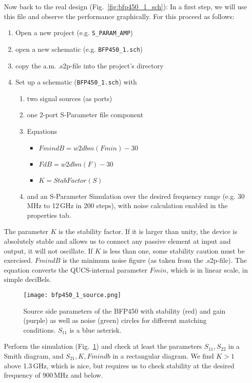 Now back to the real design (Fig.~\ref{fig:bfp450_1_sch}): In a first step,
we will use this file and observe the performance graphically. For
this proceed as follows:
\begin{enumerate}
\item Open a new project (e.g. \texttt{S\_PARAM\_AMP})
\item open a new schematic (e.g. \texttt{BFP450\_1.sch})
\item copy the a.m. .s2p-file into the project's directory
\item Set up a schematic (\texttt{BFP450\_1.sch}) with
  \begin{enumerate}
  \item two signal sources (as ports)
  \item one 2-port S-Parameter file component
  \item Equations
    \begin{itemize}
    \item $FmindB=w2dbm(Fmin)-30$
    \item $FdB=w2dbm(F)-30$
    \item $K=StabFactor(S)$
    \end{itemize}
  \item and an S-Parameter Simulation over the desired frequency range
    (e.g. 30\,MHz to 12\,GHz in 200 steps), with noise calculation
    enabled in the properties tab.
  \end{enumerate}
\end{enumerate}
The parameter $K$ is the stability factor. If it is larger than unity,
the device is absolutely stable and allows us to connect any passive
element at input and output, it will not oscillate. If $K$ is less
than one, some stability caution must be exercised. $FmindB$ is the
minimum noise figure (as taken from the .s2p-file). The equation
converts the QUCS-internal parameter $Fmin$, which is in linear scale,
in simple deciBels.

\begin{figure}
  \centering
  {\texttt{[image: bfp450\_1\_source.png]}}
  \caption{Source side parameters of the BFP450 with stability (red) and
    gain (purple) as well as noise (green) circles for different
    matching conditions. $S_{11}$ is a blue asterisk.}
  \label{fig:bfp450_1_source}
\end{figure}

Perform the simulation (Fig.~\ref{fig:bfp450_1_source}) and check at
least the parameters $S_{11},S_{22}$ in a Smith diagram, and $S_{21},
K, Fmindb$ in a rectangular diagram. We find $K>1$ above 1.3\,GHz,
which is nice, but requires us to check stability at the desired
frequency of 900\,MHz and below.

